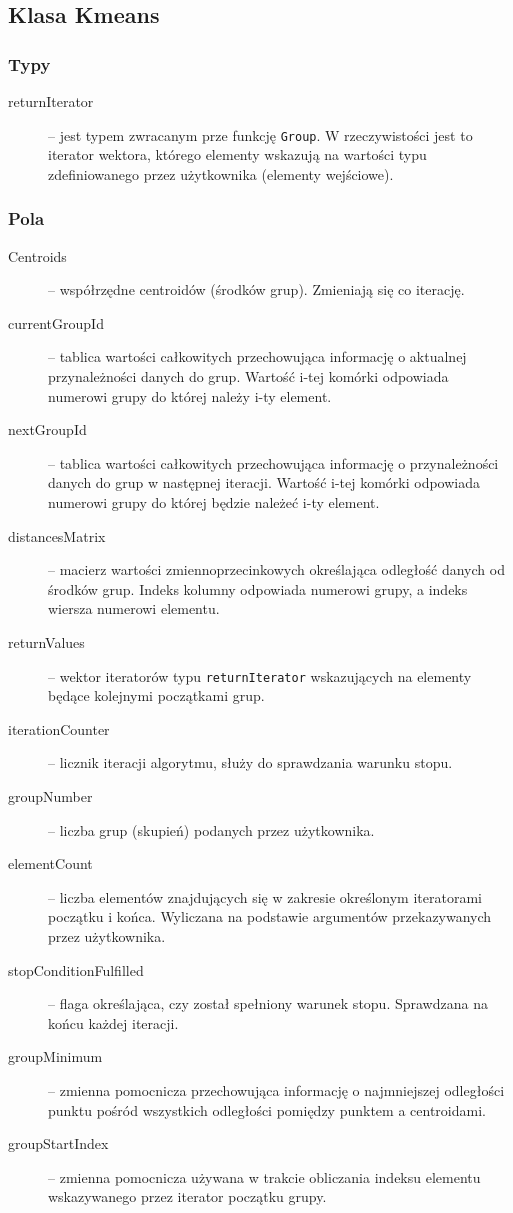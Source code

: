 \subsection{Klasa K\textunderscore means}\label{kmeans}

\subsubsection{Typy}

\begin{description}
	\item[returnIterator] -- jest typem zwracanym prze funkcję \texttt{Group}. W rzeczywistości jest to iterator wektora, którego elementy wskazują na wartości typu zdefiniowanego przez użytkownika (elementy wejściowe).
\end{description}

\subsubsection{Pola}

\begin{description}
	\item[Centroids] -- współrzędne centroidów (środków grup). Zmieniają się co iterację.
	\item[currentGroupId] -- tablica wartości całkowitych przechowująca informację o aktualnej przynależności danych do grup. Wartość i-tej komórki odpowiada numerowi grupy do której należy i-ty element.
	\item[nextGroupId] -- tablica wartości całkowitych przechowująca informację o przynależności danych do grup w następnej iteracji. Wartość i-tej komórki odpowiada numerowi grupy do której będzie należeć i-ty element.
	\item[distancesMatrix] -- macierz wartości zmiennoprzecinkowych określająca odległość danych od środków grup. Indeks kolumny odpowiada numerowi grupy, a indeks wiersza numerowi elementu.
	\item[returnValues] --  wektor iteratorów typu \texttt{returnIterator} wskazujących na elementy będące kolejnymi początkami grup.
	\item[iterationCounter] -- licznik iteracji algorytmu, służy do sprawdzania warunku stopu.
	\item[groupNumber] -- liczba grup (skupień) podanych przez użytkownika.
	\item[elementCount] -- liczba elementów znajdujących się w zakresie określonym iteratorami początku i końca. Wyliczana na podstawie argumentów przekazywanych przez użytkownika.
	\item[stopConditionFulfilled] -- flaga określająca, czy został spełniony warunek stopu. Sprawdzana na końcu każdej iteracji.
	\item[groupMinimum] -- zmienna pomocnicza przechowująca informację o najmniejszej odległości punktu pośród wszystkich odległości pomiędzy punktem a centroidami.
	\item[groupStartIndex] -- zmienna pomocnicza używana w trakcie obliczania indeksu elementu wskazywanego przez iterator początku grupy.
	
\end{description}

